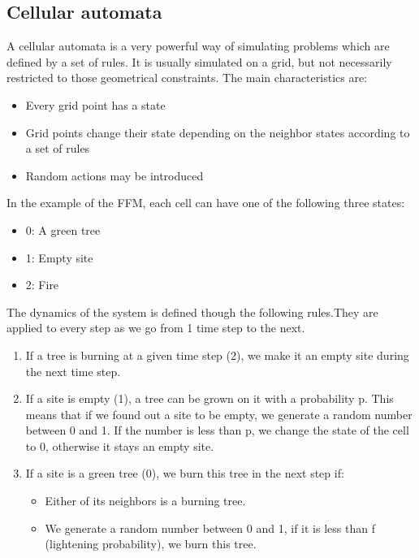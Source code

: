 \documentclass[11pt]{article}
\begin{document}
\subsection{Cellular automata}

A cellular automata is a very powerful way of simulating problems which are defined by a set of rules. It is usually simulated on a grid, but not necessarily restricted to those geometrical constraints. The main characteristics are:
\begin{itemize}
\item Every grid point has a state

\item Grid points change their state depending on the neighbor states according to a set of rules

\item Random actions may be introduced
\end{itemize}

In the example of the FFM, each cell can have one of the following three states:
\begin{itemize}
  \item 0: A green tree
  \item 1: Empty site
  \item 2: Fire
\end{itemize}

The dynamics of the system is defined though the following rules.They are applied to every step as we go from 1 time step to the next.
\begin{enumerate}
\item If a tree is burning at a given time step (2), we make it an empty site during the next time step.
\item If a site is empty (1), a tree can be grown on it with a probability p. This means that if we found out a site to be empty, we generate a random number between 0 and 1. If the number is less than p, we change the state of the cell to 0, otherwise it stays an empty site.
\item If a site is a green tree (0), we burn this tree in the next step if:

\begin{itemize}
\item Either of its neighbors is a burning tree.
\item We generate a random number between 0 and 1, if it is less than f (lightening probability), we burn this tree.
\end{itemize}
\end{enumerate}
\end{document}
